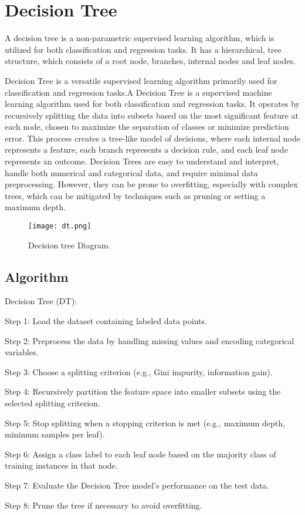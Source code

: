 \documentclass[12pt,a4paper]{report}
\begin{document}
\chapter{Decision Tree}
A decision tree is a non-parametric supervised learning algorithm, which is utilized for both classification and regression tasks. It has a hierarchical, tree structure, which consists of a root node, branches, internal nodes and leaf nodes.\par 
Decision Tree is a versatile supervised learning algorithm primarily used for classification and regression tasks.A Decision Tree is a supervised machine learning algorithm used for both classification and regression tasks. It operates by recursively splitting the data into subsets based on the most significant feature at each node, chosen to maximize the separation of classes or minimize prediction error. This process creates a tree-like model of decisions, where each internal node represents a feature, each branch represents a decision rule, and each leaf node represents an outcome. Decision Trees are easy to understand and interpret, handle both numerical and categorical data, and require minimal data preprocessing. However, they can be prone to overfitting, especially with complex trees, which can be mitigated by techniques such as pruning or setting a maximum depth.

\begin{figure}[ht]
  \centering
 \texttt{[image: dt.png]}
  \caption{Decision tree Diagram.}
\end{figure}


\section{Algorithm}
Decision Tree (DT): \par
Step 1: Load the dataset containing labeled data points.\par
 Step 2: Preprocess the data by handling missing values and encoding categorical variables.\par
  Step 3: Choose a splitting criterion (e.g., Gini impurity, information gain).\par
  Step 4: Recursively partition the feature space into smaller subsets using the selected splitting criterion.\par
  Step 5: Stop splitting when a stopping criterion is met (e.g., maximum depth, minimum samples per leaf).\par
  Step 6: Assign a class label to each leaf node based on the majority class of training instances in that node.\par
  Step 7: Evaluate the Decision Tree model's performance on the test data.\par
  Step 8: Prune the tree if necessary to avoid overfitting.\par
  
\end{document}
